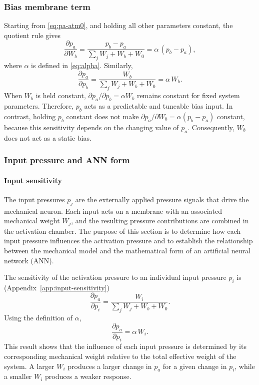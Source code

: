 \documentclass[11pt,a4paper]{article}
\numberwithin{equation}{section}
\begin{document}
\subsubsection{Bias membrane term}

Starting from \cref{eq:pa-atm0}, and holding all other parameters constant, the quotient rule gives
\begin{equation}
  \frac{\partial p_a}{\partial W_b} = \frac{p_b - p_a}{\sum_j W_j + W_b + W_0} = \alpha\,(p_b - p_a),
  \label{eq:dpa-dwb}
\end{equation}
where $\alpha$ is defined in \cref{eq:alpha}. Similarly,
\begin{equation}
  \frac{\partial p_a}{\partial p_b} = \frac{W_b}{\sum_j W_j + W_b + W_0} = \alpha\,W_b .
  \label{eq:dpa-dpb}
\end{equation}
When $W_b$ is held constant, $\partial p_a/\partial p_b = \alpha W_b$ remains constant for fixed system parameters.
Therefore, $p_b$ acts as a predictable and tuneable bias input. In contrast, holding $p_b$ constant does not make
$\partial p_a/\partial W_b = \alpha(p_b - p_a)$ constant, because this sensitivity depends on the changing value of
$p_a$. Consequently, $W_b$ does not act as a static bias.

\subsubsection{Input pressure and ANN form}

\paragraph{Input sensitivity}

The input pressures $p_j$ are the externally applied pressure signals that drive the mechanical neuron. Each input
acts on a membrane with an associated mechanical weight $W_j$, and the resulting pressure contributions are combined
in the activation chamber. The purpose of this section is to determine how each input pressure influences the
activation pressure and to establish the relationship between the mechanical model and the mathematical form of an
artificial neural network (ANN).

The sensitivity of the activation pressure to an individual input pressure $p_i$ is (Appendix~\ref{app:input-sensitivity})
\begin{equation}
  \frac{\partial p_a}{\partial p_i} = \frac{W_i}{\sum_j W_j + W_b + W_0} .
  \label{eq:dpa-dpi}
\end{equation}
Using the definition of $\alpha$,
\begin{equation}
  \frac{\partial p_a}{\partial p_i} = \alpha\,W_i .
  \label{eq:dpa-dpi-alpha}
\end{equation}
This result shows that the influence of each input pressure is determined by its corresponding mechanical weight
relative to the total effective weight of the system. A larger $W_i$ produces a larger change in $p_a$ for a given
change in $p_i$, while a smaller $W_i$ produces a weaker response.
\end{document}

